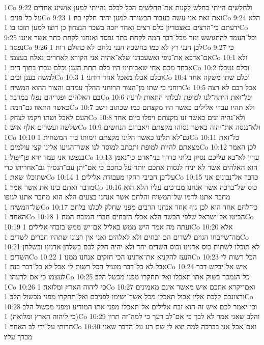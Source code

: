 1Co 9:22  ולחלשים הייתי כחלש לקנות את־החלשים הכל לכלם נהייתי למען אושיע אחדים על כל־פנים׃
1Co 9:23  ואת־זאת אני עשה בעבור הבשורה למען יהיה חלקי בה׃
1Co 9:24  הלא ידעתם כי־הרצים באצטדיון כלם רצים ואחד יזכה בשכר הנצחון כן רוצו למען תזכו בו׃
1Co 9:25  וכל־העמד להתגושש ינזר מכל־דבר המה לקחת כתר נפסד ואנחנו לקחת כתר אשר איננו נפסד׃
1Co 9:26  לכן הנני רץ לא כמו בחשכה הנני נלחם לא כהולם רוח׃
1Co 9:27  כי אם־אדכא את־גופי ואשעבדנו שלא־אהיה אני הקורא לאחרים נאלח בעצמי׃
1Co 10:1  ולא אכחד מכם אחי שאבותינו היו כלם תחת הענן וכלם עברו בתוך הים׃
1Co 10:2  וכלם נטבלו למשה בענן ובים׃
1Co 10:3  וכלם אכלו מאכל אחד רוחני׃
1Co 10:4  וכלם שתו משקה אחד רוחני כי שתו מן־הצור הרוחני ההלך עמהם והצור ההוא המשיח׃
1Co 10:5  אבל רבם לא רצה בם האלהים ופגריהם נפלו במדבר׃
1Co 10:6  וכל־זאת היתה־לנו למופת לבלתי התאות לרעה כאשר התאוו גם־המה׃
1Co 10:7  ולא תהיו עבדי אלילים כאשר היו מקצתם כמו שכתוב וישב העם לאכל ושתו ויקמו לצחק׃
1Co 10:8  ולא־נהיה זנים כאשר זנו מקצתם ויפלו ביום אחד שלשה ועשרים אלף איש׃
1Co 10:9  ולא־ננסה את־יהוה כאשר נסוהו מקצתם ויאבדום הנחשים׃
1Co 10:10  גם־לא תלינו כאשר הלינו מקצתם וימותו ביד המשחית׃
1Co 10:11  כל־זאת מצאתם להיות למופת ותכתב למוסר לנו אשר־הגיעו אלינו קצי עולמים׃
1Co 10:12  לכן האמר בנפשו אני עמד ירא פן־יפול׃
1Co 10:13  עדין לא־בא עליכם נסיון בלתי כדרך בני־אדם כי־נאמן הוא האלהים אשר לא יניח לנסות אתכם יותר על כחכם כי אם־יתן עם־הנסיון גם־אחריתו כדי שתוכלו שאת׃
1Co 10:14  על־כן חביבי רחקו מעבודת אלילים׃
1Co 10:15  כדבר אל־נבונים אני מדבר ואתם בינו את אשר אמר׃
1Co 10:16  כוס של־ברכה אשר אנחנו מברכים עליו הלא הוא מחבר אתנו לדמו של־המשיח והלחם אשר אנחנו בצעים הלא הוא מחבר אתנו לגופו של־המשיח׃
1Co 10:17  כי־לחם אחד הוא לכן גוף אחד אנחנו הרבים מפני שחלק לכלנו בלחם האחד׃
1Co 10:18  הביטו אל־ישראל שלפי הבשר הלא אכלי הזבחים חברי המזבח המה׃
1Co 10:19  ועתה מה אמר היש ממש באליל אם־יש ממש בזבחי אלילים׃
1Co 10:20  אלא מה־שיזבחו הגוים לשדים הם זבחים ולא לאלהים ואני אין רצוני שתהיו חברים לשדים׃
1Co 10:21  לא תוכלו לשתות כוס אדנינו וכוס השדים יחד ולא יהיה חלק לכם בשלחן אדנינו ובשלחן השדים׃
1Co 10:22  הנעז להקניא את־אדנינו הכי חזקים אנחנו ממנו׃
1Co 10:23  הכל רשות לי אבל לא כל־דבר מועיל הכל רשות לי אבל לא כל־דבר בנה׃
1Co 10:24  איש אל־יבקש דבר לעצמו כי אם־לרעהו׃
1Co 10:25  כל־הנמכר בשוק אתו תאכלו ואל־תחקרו מפני מכשל הלב׃
1Co 10:26  כי ליהוה הארץ ומלואה׃
1Co 10:27  ואם־יקרא אתכם איש מאשר אינם מאמינים ורצונכם ללכת אליו אכול תאכלו מכל אשר־ישימו לפניכם ואל־תחקרו מפני מכשול הלב׃
1Co 10:28  וכי־יאמר לכם איש זה הוא זבח אלילים אל־תאכלו מפני אתו המודיע ומפני מכשול הלב (כי ליהוה הארץ ומלואה)׃
1Co 10:29  והלב שאני אמר לא לבך כי אם־לב רעך כי למה־זה תדון חרותי על־ידי לב האחר׃
1Co 10:30  ואם־אכל אני בברכה למה יצא לי שם רע על־הדבר שאני מברך עליו׃
